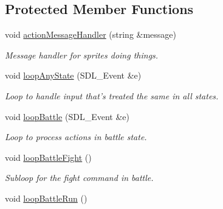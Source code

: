 \subsection*{Protected Member Functions}
\begin{DoxyCompactItemize}
\item 
void \hyperlink{class_game_state_aa306dcbd8b3ec33fbf9d41bd959fdbd4}{action\+Message\+Handler} (string \&message)\hypertarget{class_game_state_aa306dcbd8b3ec33fbf9d41bd959fdbd4}{}\label{class_game_state_aa306dcbd8b3ec33fbf9d41bd959fdbd4}

\begin{DoxyCompactList}\small\item\em Message handler for sprites doing things. \end{DoxyCompactList}\item 
void \hyperlink{class_game_state_a6bcac85dc5a7ce95e58c32d0948b54df}{loop\+Any\+State} (S\+D\+L\+\_\+\+Event \&e)\hypertarget{class_game_state_a6bcac85dc5a7ce95e58c32d0948b54df}{}\label{class_game_state_a6bcac85dc5a7ce95e58c32d0948b54df}

\begin{DoxyCompactList}\small\item\em Loop to handle input that’s treated the same in all states. \end{DoxyCompactList}\item 
void \hyperlink{class_game_state_a78ccdca45d646c8bec157fb6207ada04}{loop\+Battle} (S\+D\+L\+\_\+\+Event \&e)\hypertarget{class_game_state_a78ccdca45d646c8bec157fb6207ada04}{}\label{class_game_state_a78ccdca45d646c8bec157fb6207ada04}

\begin{DoxyCompactList}\small\item\em Loop to process actions in battle state. \end{DoxyCompactList}\item 
void \hyperlink{class_game_state_a8eababbfcac6ae424541fb61e8534682}{loop\+Battle\+Fight} ()\hypertarget{class_game_state_a8eababbfcac6ae424541fb61e8534682}{}\label{class_game_state_a8eababbfcac6ae424541fb61e8534682}

\begin{DoxyCompactList}\small\item\em Subloop for the \textquotesingle{}fight\textquotesingle{} command in battle. \end{DoxyCompactList}\item 
void \hyperlink{class_game_state_ac3101f8eba8251f27acfcf082140908d}{loop\+Battle\+Run} ()\hypertarget{class_game_state_ac3101f8eba8251f27acfcf082140908d}{}\label{class_game_state_ac3101f8eba8251f27acfcf082140908d}


\end{DoxyCompactItemize}
